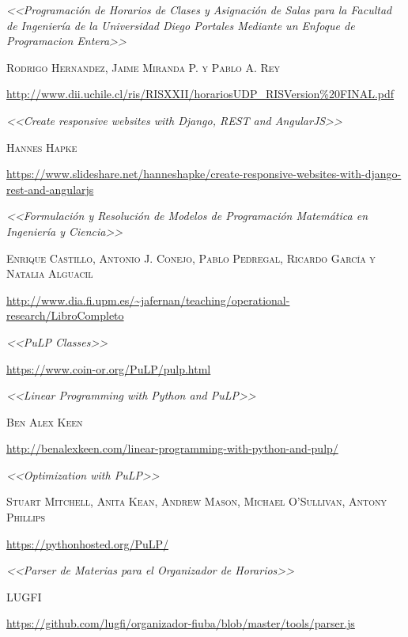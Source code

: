 \documentclass[a4paper]{article}
\begin{document}
\begin{thebibliography}{X}

 \textit{<<Programación de Horarios de Clases y Asignación de Salas para la Facultad de Ingeniería de la Universidad Diego Portales Mediante un Enfoque de Programacion Entera>>}

\textsc{Rodrigo Hernandez, Jaime Miranda P. y Pablo A. Rey}

\url{http://www.dii.uchile.cl/ris/RISXXII/horariosUDP_RISVersion%20FINAL.pdf}


 \textit{<<Create responsive websites with Django, REST and AngularJS>>}

\textsc{Hannes Hapke}

\url{https://www.slideshare.net/hanneshapke/create-responsive-websites-with-django-rest-and-angularjs}


 \textit{<<Formulación y Resolución de Modelos de Programación Matemática en Ingeniería y Ciencia>>}

\textsc{Enrique Castillo, Antonio J. Conejo, Pablo Pedregal, Ricardo García y Natalia Alguacil}

\url{http://www.dia.fi.upm.es/~jafernan/teaching/operational-research/LibroCompleto}


 \textit{<<PuLP Classes>>}

\url{https://www.coin-or.org/PuLP/pulp.html}


 \textit{<<Linear Programming with Python and PuLP>>}

\textsc{Ben Alex Keen}

\url{http://benalexkeen.com/linear-programming-with-python-and-pulp/}


 \textit{<<Optimization with PuLP>>}

\textsc{Stuart Mitchell, Anita Kean, Andrew Mason, Michael O’Sullivan, Antony Phillips}

\url{https://pythonhosted.org/PuLP/}


 \textit{<<Parser de Materias para el Organizador de Horarios>>}

\textsc{LUGFI}

\url{https://github.com/lugfi/organizador-fiuba/blob/master/tools/parser.js}

\end{thebibliography}
\end{document}
